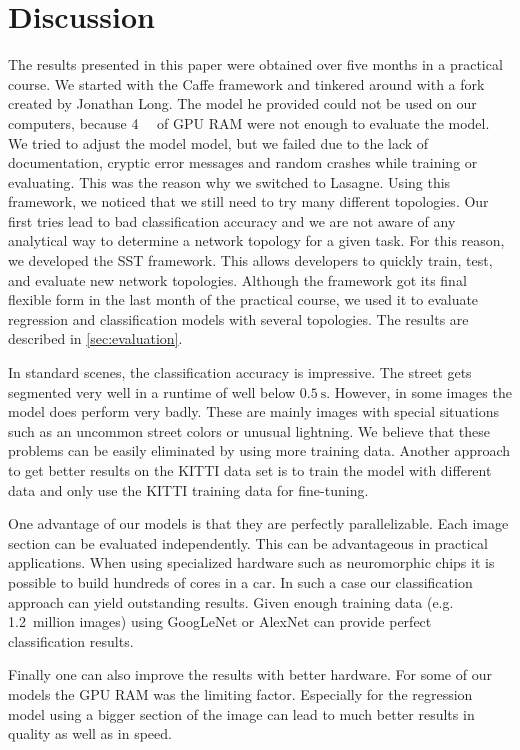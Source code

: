 
\section{Discussion}\label{sec:discussion}

The results presented in this paper were obtained over five months in a
practical course. We started with the Caffe framework and tinkered around with
a fork created by Jonathan Long. The model he provided could not be used on our
computers, because \SI{4}{\giga\byte} of GPU RAM were not enough to evaluate
the model. We tried to adjust the model model, but we failed due to the lack of
documentation, cryptic error messages and random crashes while training or
evaluating. This was the reason why we switched to Lasagne. Using this
framework, we noticed that we still need to try many different topologies. Our
first tries lead to bad classification accuracy and we are not aware of any
analytical way to determine a network topology for a given task. For this
reason, we developed the SST framework. This allows developers to quickly
train, test, and evaluate new network topologies. Although the framework got
its final flexible form in the last month of the practical course, we used it
to evaluate regression and classification models with several topologies. The
results are described in \cref{sec:evaluation}.

In standard scenes, the classification accuracy is impressive. The street gets
segmented very well in a runtime of well below  $\SI{0.5}{\second}$. However,
in some images the model does perform very badly. These are mainly images with
special situations such as an uncommon street colors or unusual lightning. We
believe that these problems can be easily eliminated by using more training
data. Another approach to get better results on the KITTI data set is to train
the model with different data and only use the KITTI training data for
fine-tuning.

One advantage of our models is that they are perfectly parallelizable. Each
image section can be evaluated independently. This can be advantageous in
practical applications. When using specialized hardware such as neuromorphic
chips it is possible to build hundreds of cores in a car. In such a case our
classification approach can yield outstanding results. Given enough training
data (e.g. 1.2~million images) using GoogLeNet or AlexNet can provide perfect
classification results.

Finally one can also improve the results with better hardware. For some of our
models the \gls{GPU} RAM was the limiting factor. Especially for the regression
model using a bigger section of the image can lead to much better results in
quality as well as in speed.
